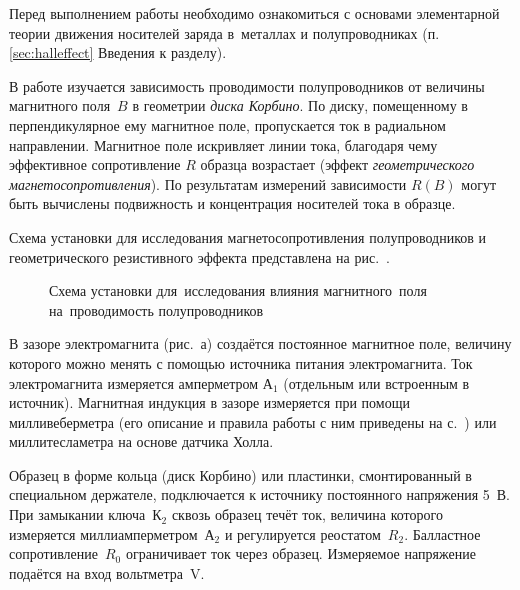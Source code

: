 


Перед выполнением работы необходимо ознакомиться с основами
элементарной теории движения носителей заряда в~металлах и полупроводниках
(п. \ref{sec:halleffect} Введения к разделу).

В работе изучается зависимость проводимости полупроводников от величины 
магнитного поля~$B$ в геометрии \emph{диска Корбино}.
По диску, помещенному в перпендикулярное ему магнитное поле, пропускается
ток в радиальном направлении. Магнитное поле искривляет линии 
тока, благодаря чему эффективное сопротивление $R$ образца возрастает
(эффект \emph{геометрического магнетосопротивления}). По результатам
измерений зависимости $R(B)$ могут быть вычислены подвижность и концентрация 
носителей тока в образце.

\experiment
Схема установки для исследования магнетосопротивления
полупроводников и геометрического резистивного эффекта представлена на
рис.~.

\begin{figure}[h!]
    \centering
    \caption{Схема установки для~исследования влияния магнитного~поля
        на~проводимость полупроводников}
\end{figure}

В зазоре электромагнита (рис.~а) создаётся постоянное магнитное
поле, величину которого можно менять с помощью источника питания электромагнита.
Ток электромагнита измеряется амперметром А$_1$ (отдельным или встроенным в источник).
Магнитная индукция в зазоре измеряется при помощи милливеберметра (его описание
и правила работы с ним приведены на с.~\pageref{MWB}) или 
миллитесламетра на основе датчика Холла.

Образец в форме кольца (диск Корбино) или пластинки, смонтированный в
специальном держателе, подключается к источнику постоянного напряжения 5~В. При
замыкании ключа~К$_2$ сквозь образец течёт ток, величина которого измеряется
миллиамперметром~А$_2$ и регулируется реостатом~$R_2$. Балластное сопротивление~$R_0$
ограничивает ток через образец. Измеряемое напряжение подаётся на вход
вольтметра~V.

